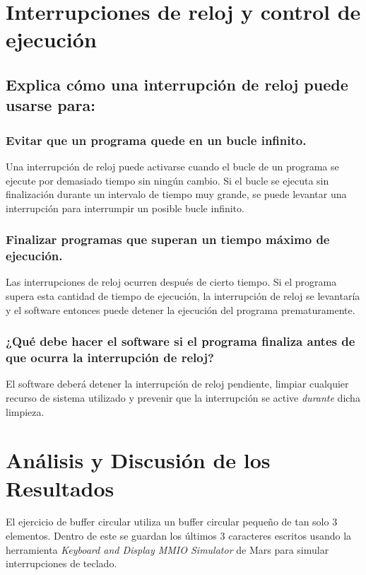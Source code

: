 \documentclass[titlepage]{article}
\begin{document}
\section*{Interrupciones de reloj y control de ejecución}

\subsection*{Explica cómo una interrupción de reloj puede usarse para:}

\subsubsection*{Evitar que un programa quede en un bucle infinito.}

Una interrupción de reloj puede activarse cuando el bucle de un programa se ejecute por demasiado tiempo sin ningún cambio. Si el bucle se ejecuta sin finalización durante un intervalo de tiempo muy grande, se puede levantar una interrupción para interrumpir un posible bucle infinito.

\subsubsection*{Finalizar programas que superan un tiempo máximo de ejecución.}

Las interrupciones de reloj ocurren después de cierto tiempo. Si el programa supera esta cantidad de tiempo de ejecución, la interrupción de reloj se levantaría y el software entonces puede detener la ejecución del programa prematuramente.

\subsubsection*{¿Qué debe hacer el software si el programa finaliza antes de que ocurra la interrupción de reloj?}

El software deberá detener la interrupción de reloj pendiente, limpiar cualquier recurso de sistema utilizado y prevenir que la interrupción se active \emph{durante} dicha limpieza.

\section*{Análisis y Discusión de los Resultados}

El ejercicio de buffer circular utiliza un buffer circular pequeño de tan solo 3 elementos. Dentro de este se guardan los últimos 3 caracteres escritos usando la herramienta \emph{Keyboard and Display MMIO Simulator} de Mars para simular interrupciones de teclado.
\end{document}
